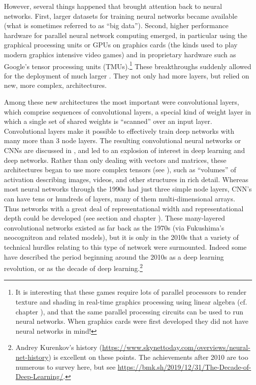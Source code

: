 However, several things happened that brought attention back to neural networks. First, larger datasets for training neural networks became available (what is sometimes referred to as ``big data''). Second, higher performance hardware for parallel neural network computing emerged, in particular using the graphical processing units or GPUs on graphics cards (the kinds used to play modern graphics intensive video games) and in proprietary hardware such as Google's tensor processing units (TMUs).\footnote{It is interesting that these games require lots of parallel processors to render texture and shading in real-time graphics processing using linear algebra (cf. chapter ), and that the same parallel processing circuits can be used to run neural networks. When graphics cards were first developed they did not have neural networks in mind!} These breakthroughs suddenly allowed for the deployment of much larger . They not only had more layers, but relied on new, more complex, architectures.

Among these new architectures the most important were convolutional layers, which comprise sequences of convolutional layers, a special kind of weight layer in which a single set of shared weights is “scanned” over an input layer. Convolutional layers make it possible to effectively train deep networks with many more than 3 node layers.  The resulting convolutional neural networks or CNNs are discussed in  , and led to an explosion of interest in deep learning and deep networks. Rather than only dealing with vectors and matrices, these architectures began to use more complex tensors (see ), such as ``volumes'' of activation describing images, videos, and other structures in rich detail.  Whereas most neural networks through the 1990s had just three simple node layers, CNN's can have tens or hundreds of layers, many of them multi-dimensional arrays. Thus networks with  a great deal of representational width and representational depth could be developed (see section  and chapter ). These many-layered convolutional networks existed as far back as the 1970s (via Fukushima's neocognitron and related models), but it is only in the 2010s  that a variety of technical hurdles relating to this type of network were surmounted. Indeed some have described the period beginning around the 2010s as a deep learning revolution, or as the decade of deep learning.\footnote{Andrey Kurenkov's history (\url{https://www.skynettoday.com/overviews/neural-net-history}) is excellent on these points. The achievements after 2010 are too numerous to survey here, but see \url{https://bmk.sh/2019/12/31/The-Decade-of-Deep-Learning/}.}  

